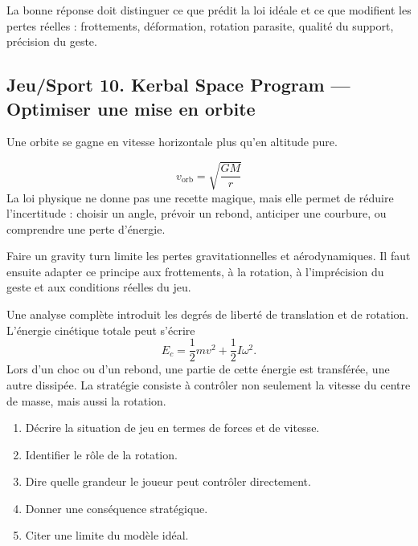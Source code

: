 \documentclass[11pt,a4paper]{article}
\begin{document}
\begin{corrigebox}[Indication]
La bonne réponse doit distinguer ce que prédit la loi idéale et ce que modifient les pertes réelles : frottements, déformation, rotation parasite, qualité du support, précision du geste.
\end{corrigebox}


\subsection{Jeu/Sport 10. Kerbal Space Program — Optimiser une mise en orbite}

\begin{exemplebox}[Observation]
Une orbite se gagne en vitesse horizontale plus qu'en altitude pure.
\end{exemplebox}

\begin{theorembox}
\[
v_{\mathrm{orb}}=\sqrt{\frac{GM}{r}}
\]
La loi physique ne donne pas une recette magique, mais elle permet de réduire l'incertitude : choisir un angle, prévoir un rebond, anticiper une courbure, ou comprendre une perte d'énergie.
\end{theorembox}

\begin{methodebox}
Faire un gravity turn limite les pertes gravitationnelles et aérodynamiques.
Il faut ensuite adapter ce principe aux frottements, à la rotation, à l'imprécision du geste et aux conditions réelles du jeu.
\end{methodebox}

\begin{approfondissementbox}
Une analyse complète introduit les degrés de liberté de translation et de rotation. L'énergie cinétique totale peut s'écrire
\[
E_c=\frac12mv^2+\frac12I\omega^2.
\]
Lors d'un choc ou d'un rebond, une partie de cette énergie est transférée, une autre dissipée. La stratégie consiste à contrôler non seulement la vitesse du centre de masse, mais aussi la rotation.
\end{approfondissementbox}

\begin{exercicebox}
\begin{enumerate}
  \item Décrire la situation de jeu en termes de forces et de vitesse.
  \item Identifier le rôle de la rotation.
  \item Dire quelle grandeur le joueur peut contrôler directement.
  \item Donner une conséquence stratégique.
  \item Citer une limite du modèle idéal.
\end{enumerate}
\end{exercicebox}
\end{document}
